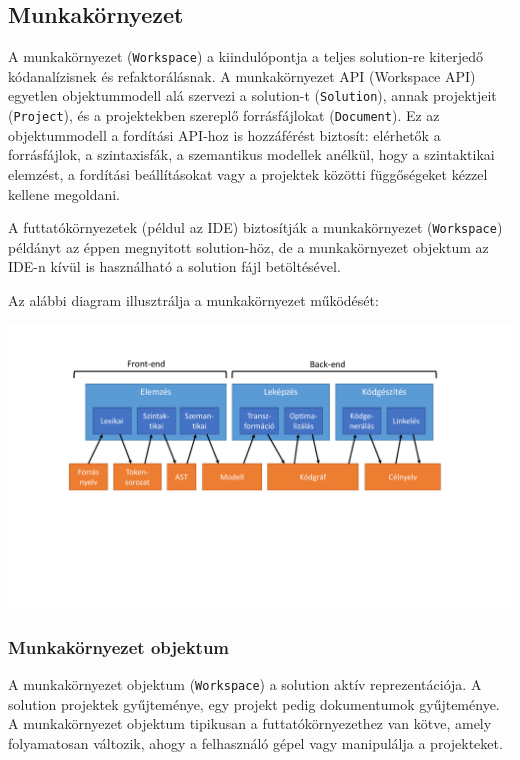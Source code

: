 \documentclass[12pt, a4paper]{report}
\newcommand{\f}[1]{\texttt{#1}}
\begin{document}
\subsection{Munkakörnyezet}

A munkakörnyezet (\f{Workspace}) a kiindulópontja a teljes solution-re kiterjedő kódanalízisnek és refaktorálásnak. A munkakörnyezet API (Workspace API) egyetlen objektummodell alá szervezi a solution-t (\f{Solution}), annak projektjeit (\f{Project}), és a projektekben szereplő forrásfájlokat (\f{Document}). Ez az objektummodell a fordítási API-hoz is hozzáférést biztosít: elérhetők a forrásfájlok, a szintaxisfák, a szemantikus modellek anélkül, hogy a szintaktikai elemzést, a fordítási beállításokat vagy a projektek közötti függőségeket kézzel kellene megoldani.

A futtatókörnyezetek (példul az IDE) biztosítják a munkakörnyezet (\f{Workspace}) példányt az éppen megnyitott solution-höz, de a munkakörnyezet objektum az IDE-n kívül is használható a solution fájl betöltésével.

Az alábbi diagram illusztrálja a munkakörnyezet működését:

\begin{center}\includegraphics[trim=120 140 90 60,clip,width=\textwidth,page=5]{Images.pdf}\end{center}

\subsubsection{Munkakörnyezet objektum}

A munkakörnyezet objektum (\f{Workspace}) a solution aktív reprezentációja. A solution projektek gyűjteménye, egy projekt pedig dokumentumok gyűjteménye. A munkakörnyezet objektum tipikusan a futtatókörnyezethez van kötve, amely folyamatosan változik, ahogy a felhasználó gépel vagy manipulálja a projekteket.
\end{document}
